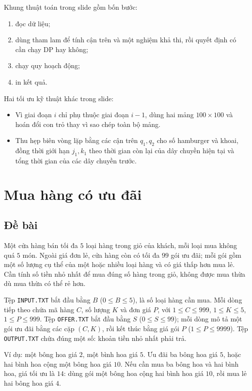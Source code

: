 \documentclass[11pt]{article}
\begin{document}
Khung thuật toán trong slide gồm bốn bước:
\begin{enumerate}
  \item đọc dữ liệu;
  \item dùng tham lam để tính cận trên và một nghiệm khả thi, rồi quyết định
        có cần chạy DP hay không;
  \item chạy quy hoạch động;
  \item in kết quả.
\end{enumerate}

Hai tối ưu kỹ thuật khác trong slide:
\begin{itemize}
  \item Vì giai đoạn \(i\) chỉ phụ thuộc giai đoạn \(i-1\), dùng hai mảng
  \(100\times100\) và hoán đổi con trỏ thay vì sao chép toàn bộ mảng.
  \item Thu hẹp biên vòng lặp bằng các cận trên \(q_1,q_2\) cho số hamburger
  và khoai, đồng thời giới hạn \(j_1,k_1\) theo thời gian còn lại của dây
  chuyền hiện tại và tổng thời gian của các dây chuyền trước.
\end{itemize}

\section{Mua hàng có ưu đãi}

\subsection{Đề bài}

Một cửa hàng bán tối đa \(5\) loại hàng trong giỏ của khách, mỗi loại mua
không quá \(5\) món. Ngoài giá đơn lẻ, cửa hàng còn có tối đa \(99\) gói ưu
đãi; mỗi gói gồm một số lượng cụ thể của một hoặc nhiều loại hàng và có giá
thấp hơn mua lẻ. Cần tính số tiền nhỏ nhất để mua đúng số hàng trong giỏ,
không được mua thừa dù mua thừa có thể rẻ hơn.

Tệp \texttt{INPUT.TXT} bắt đầu bằng \(B\) (\(0\le B\le 5\)), là số loại hàng
cần mua. Mỗi dòng tiếp theo chứa mã hàng \(C\), số lượng \(K\) và đơn giá
\(P\), với \(1\le C\le 999\), \(1\le K\le 5\), \(1\le P\le 999\). Tệp
\texttt{OFFER.TXT} bắt đầu bằng \(S\) (\(0\le S\le 99\)); mỗi dòng mô tả một
gói ưu đãi bằng các cặp \((C,K)\), rồi kết thúc bằng giá gói \(P\)
(\(1\le P\le 9999\)). Tệp \texttt{OUTPUT.TXT} chứa đúng một số: khoản tiền
nhỏ nhất phải trả.

Ví dụ: một bông hoa giá \(2\), một bình hoa giá \(5\). Ưu đãi ba bông hoa giá
\(5\), hoặc hai bình hoa cộng một bông hoa giá \(10\). Nếu cần mua ba bông hoa
và hai bình hoa, giá tối ưu là \(14\): dùng gói một bông hoa cộng hai bình
hoa giá \(10\), rồi mua lẻ hai bông hoa giá \(4\).
\end{document}
